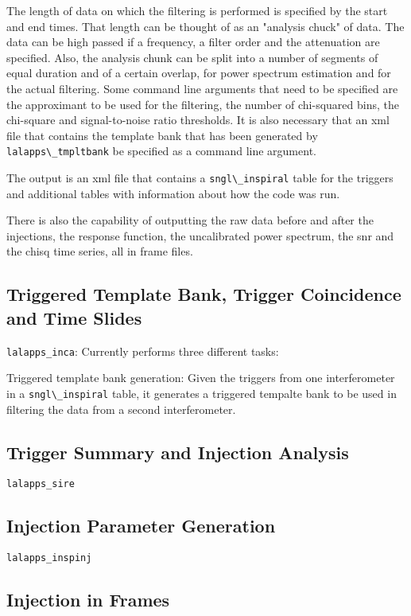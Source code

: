 The length of data on which the filtering is performed is specified by the start and end
times. That length can be thought of as an "analysis chuck" of data.
The data can be high passed if a frequency, a filter order and the
attenuation are specified. Also, the analysis chunk can be split into a number of
segments of equal duration and of a certain overlap, for power spectrum
estimation and for the actual filtering.
Some command line arguments that need to be specified are the approximant to
be used for the filtering, the number of chi-squared bins, the chi-square and
signal-to-noise ratio thresholds. It is also necessary that an
xml file that contains the template bank that  
has been generated by \verb$lalapps\_tmpltbank$ be specified as a command line 
argument.

The output is an xml file that contains a
\verb$sngl\_inspiral$ table for the triggers and additional tables with
information about how the code was run.

There is also the capability of outputting the raw data before and after the
injections, the response function, the uncalibrated power spectrum, the snr
and the chisq time series, all in frame files.

\subsection{Triggered Template Bank, Trigger Coincidence and Time Slides}

\texttt{lalapps\_inca}: Currently performs three different tasks:

Triggered template bank generation: Given the triggers from one interferometer
in a \verb$sngl\_inspiral$ table, it generates a triggered tempalte bank to be
used in filtering the data from a second interferometer. 



\subsection{Trigger Summary and Injection Analysis}

\texttt{lalapps\_sire}

\subsection{Injection Parameter Generation}

\texttt{lalapps\_inspinj}

\subsection{Injection in Frames}

